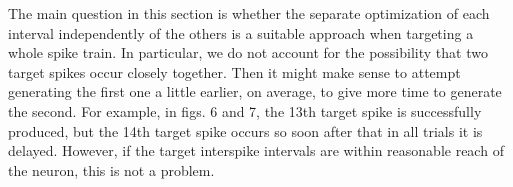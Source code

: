 \documentclass[12pt]{iopart}
\begin{document}
The main question in this section is whether the separate optimization
of each interval independently of the others is a suitable approach when
targeting a whole spike train. In particular, we do not account 
for the possibility that two target spikes occur closely together. Then
it might make sense to attempt generating the first
one a little earlier, on average, to give more time to generate the
second. For example, in figs. 6 and 7, the 13th target spike is
successfully produced, but the 14th target spike occurs so soon after
that in all trials it is delayed. However, if the target interspike
intervals are within reasonable reach of the neuron, this is not a problem.

% 
% 
 
 
\end{document}
